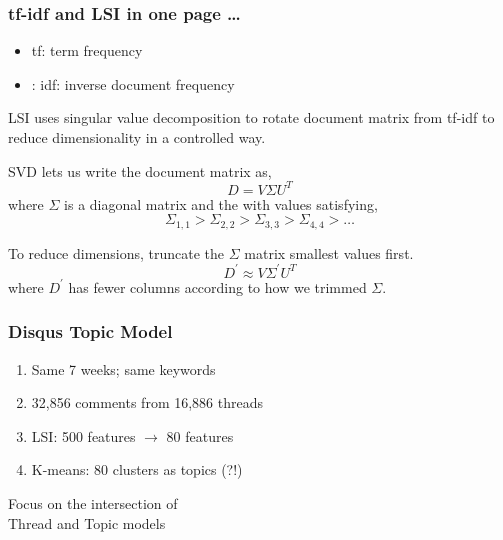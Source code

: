 \documentclass{beamer}
\begin{document}
\begin{frame}
\frametitle{tf-idf and LSI in one page \dots} 
\begin{itemize}
\item tf: term frequency
\item: idf: inverse document frequency
\end{itemize}

LSI uses singular value decomposition to rotate  document matrix from tf-idf to reduce
dimensionality in a controlled way.

SVD lets us write the document matrix as,
\begin{equation*}
D = V\Sigma U^T
\label{eq:svd}
\end{equation*}
where $\Sigma$ is a diagonal matrix and the with values satisfying,
\begin{equation*}
\Sigma_{1,1} > \Sigma_{2,2} > \Sigma_{3,3} > \Sigma_{4,4} > \ldots
\label{eq:svd}
\end{equation*}

To reduce dimensions, truncate the $\Sigma$ matrix smallest values first.
\begin{equation*}
D^\prime \approx V\Sigma^\prime U^T
\label{eq:svd}
\end{equation*}
where $D^\prime$ has fewer columns according to how we trimmed $\Sigma$.
\end{frame}



\begin{frame}\frametitle{Disqus Topic Model}
\begin{center}
{\Large 
\begin{enumerate}
\item Same 7 weeks; same keywords
\item 32,856 comments from 16,886 threads
\item LSI: 500 features $\rightarrow$ 80 features
\item K-means: 80 clusters as topics (?!)
\end{enumerate}
}
\end{center}
\end{frame}

\begin{frame}
\begin{center}
{\Huge Focus on the intersection of \\[15 pt] Thread and Topic models}
\end{center}
\end{frame}
\end{document}
